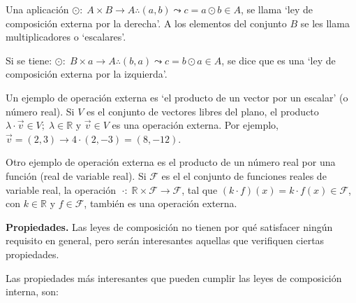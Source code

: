 \begin{defi}
Una aplicación $\odot: \; A \times B \to A \therefore (a,b) \leadsto c=a\odot b \in A$, se llama `ley de composición externa por la derecha'. A los elementos del conjunto $B$ se les llama multiplicadores o `escalares'.

Si se tiene:  $\odot: \; B \times a \to A \therefore (b,a) \leadsto c=b\odot a \in A$, se dice que es una `ley de composición externa por la izquierda'.
\end{defi}
\begin{ejem}
Un ejemplo de operación externa es `el producto de un vector por un escalar' (o número real). Si $V$ es el conjunto de vectores libres del plano, el producto $\lambda \cdot \vec{v} \in V; \; \lambda \in \mathbb R \text{ y } \vec{v} \in V$  es una operación externa. \textcolor{gris}{Por ejemplo, $\vec{v}=(2,3) \to 4\cdot (2,-3)=(8,-12)$}.

Otro ejemplo de operación externa es el producto de un número real por una función (real de variable real). Si $\mathcal F$ es el el conjunto de funciones reales de variable real, la operación $\; \cdot:\; \mathbb R \times \mathcal F \to \mathcal F$, tal que $(k\cdot f)(x)=k\cdot f(x) \in \mathcal F$, con $k \in \mathbb R$ y $f \in \mathcal F$, también es una operación externa.
\end{ejem}
\noindent \textbf{Propiedades.} Las leyes de composición no tienen por qué satisfacer ningún requisito en general, pero serán interesantes aquellas que verifiquen ciertas propiedades.

Las propiedades más interesantes que pueden cumplir las leyes de composición interna, son:

